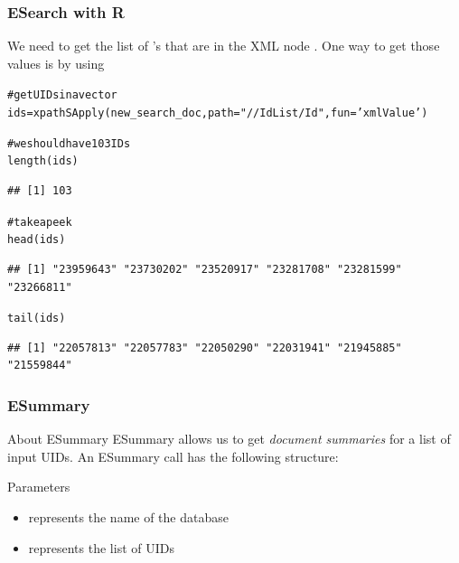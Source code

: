 \documentclass{beamer}\usepackage[]{graphicx}\usepackage[]{color}
\makeatletter
\newcommand{\hlstr}[1]{\textcolor[rgb]{0.063,0.58,0.627}{#1}}%
\newcommand{\hlcom}[1]{\textcolor[rgb]{0.588,0.588,0.588}{#1}}%
\newcommand{\hlstd}[1]{\textcolor[rgb]{0.196,0.196,0.196}{#1}}%
\newcommand{\hlkwb}[1]{\textcolor[rgb]{0.627,0,0.314}{#1}}%
\newcommand{\hlkwc}[1]{\textcolor[rgb]{0,0.631,0.314}{#1}}%
\newcommand{\hlkwd}[1]{\textcolor[rgb]{0.78,0.227,0.412}{#1}}%
\newenvironment{kframe}{%
 \def\at@end@of@kframe{}%
 \ifinner\ifhmode%
  \def\at@end@of@kframe{\end{minipage}}%
  \begin{minipage}{\columnwidth}%
 \fi\fi%
 \def\FrameCommand##1{\hskip\@totalleftmargin \hskip-\fboxsep
 \colorbox{shadecolor}{##1}\hskip-\fboxsep
     \hskip-\linewidth \hskip-\@totalleftmargin \hskip\columnwidth}%
 \MakeFramed {\advance\hsize-\width
   \@totalleftmargin\z@ \linewidth\hsize
   \@setminipage}}%
 {\par\unskip\endMakeFramed%
 \at@end@of@kframe}
\newenvironment{knitrout}{}{} %
\makeatother
\begin{document}
\begin{frame}[fragile]
\frametitle{ESearch with R}



We need to get the list of 's that are in the XML node . One way to get those values is by using 

\begin{knitrout}\tiny
{}\color{fgcolor}\begin{kframe}
\begin{alltt}
\hlcom{# get UIDs in a vector}
\hlstd{ids} \hlkwb{=} \hlkwd{xpathSApply}\hlstd{(new_search_doc,} \hlkwc{path} \hlstd{=} \hlstr{"//IdList/Id"}\hlstd{,} \hlkwc{fun} \hlstd{=} \hlstr{'xmlValue'}\hlstd{)}

\hlcom{# we should have 103 IDs}
\hlkwd{length}\hlstd{(ids)}
\end{alltt}
\begin{verbatim}
## [1] 103
\end{verbatim}
\begin{alltt}
\hlcom{# take a peek}
\hlkwd{head}\hlstd{(ids)}
\end{alltt}
\begin{verbatim}
## [1] "23959643" "23730202" "23520917" "23281708" "23281599" "23266811"
\end{verbatim}
\begin{alltt}
\hlkwd{tail}\hlstd{(ids)}
\end{alltt}
\begin{verbatim}
## [1] "22057813" "22057783" "22050290" "22031941" "21945885" "21559844"
\end{verbatim}
\end{kframe}
\end{knitrout}

\end{frame}


\begin{frame}
\frametitle{ESummary}

\begin{block}{About ESummary}
ESummary allows us to get \textit{document summaries} for a list of input UIDs. An ESummary call has the following structure: \\
\end{block}

\begin{block}{Parameters}
\begin{itemize}
 \item {} represents the name of the database
 \item {} represents the list of UIDs
\end{itemize}
\end{block}

\end{frame}
\end{document}
